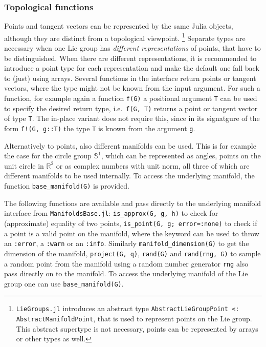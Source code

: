 \documentclass{juliacon}
\begin{document}
\subsubsection*{Topological functions}
Points and tangent vectors can be represented by the same Julia objects, although they are distinct from a topological viewpoint.%
\footnote{\texttt{LieGroups.jl} introduces an abstract type \texttt{AbstractLieGroupPoint <: AbstractManifoldPoint}, that is used to represent points on the Lie group.
This abstract supertype is not necessary, points can be represented by arrays or other types as well.}
Separate types are necessary when one Lie group has \emph{different representations} of points, that have to be distinguished. When there are different representations, it is recommended to introduce a point type for each representation and make the default one fall back to (just) using arrays.
Several functions in the interface return points or tangent vectors, where the type might not be known from the input argument. For such a function, for example again a function \verb|f(G)| a positional argument \verb|T| can be used to specify the desired return type, i.e.\ \verb|f(G, T)| returns a point or tangent vector of type \verb|T|.
The in-place variant does not require this, since in its signatgure of the form \verb|f!(G, g::T)| the type \verb|T| is known from the argument \verb|g|.

Alternatively to points, also different manifolds can be used. This is for example the case for the circle group \(\mathbb{S}^1\), which can be represented as angles, points on the unit circle in \(\mathbb{R}^2\) or as complex numbers with unit norm, all three of which are different manifolds to be used internally. To access the underlying manifold, the function \verb|base_manifold(G)| is provided.



The following functions are available and pass directly to the underlying manifold interface from \verb|ManifoldsBase.jl|:
\verb|is_approx(G, g, h)| to check for (approximate) equality of two points,
\verb|is_point(G, g; error=:none)| to check if a point is a valid point on the manifold, where the keyword can be used to throw an \verb|:error|, a \verb|:warn| or an \verb|:info|.
Similarly
\verb|manifold_dimension(G)| to get the dimension of the manifold,
\verb|project(G, q)|, %
\verb|rand(G)| and \verb|rand(rng, G)| %
to sample a random point from the manifold using a random number generator \verb|rng| also pass directly on to the manifold.
To access the underlying manifold of the Lie group one can use \verb|base_manifold(G)|.
\end{document}

